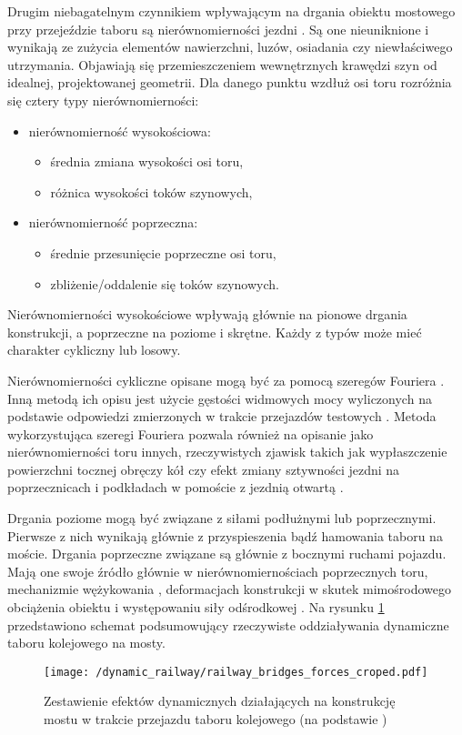 Drugim niebagatelnym czynnikiem wpływającym na drgania obiektu mostowego przy przejeździe taboru są nierównomierności jezdni \parencite{Ladislav1996,Dias2008}. Są one nieuniknione i wynikają ze zużycia elementów nawierzchni, luzów, osiadania czy niewłaściwego utrzymania. Objawiają się przemieszczeniem wewnętrznych krawędzi szyn od idealnej, projektowanej geometrii. Dla danego punktu wzdłuż osi toru rozróżnia się cztery typy nierównomierności:
\begin{itemize}[noitemsep]
	\item nierównomierność wysokościowa:
	\begin{itemize}
		\item średnia zmiana wysokości osi toru,
		\item różnica wysokości toków szynowych,
	\end{itemize}
	\item nierównomierność poprzeczna:
	\begin{itemize}
		\item średnie przesunięcie poprzeczne osi toru,
		\item zbliżenie/oddalenie się toków szynowych.
	\end{itemize}
\end{itemize}
Nierównomierności wysokościowe wpływają głównie na pionowe drgania konstrukcji, a poprzeczne na poziome i skrętne. Każdy z typów może mieć charakter cykliczny lub losowy. 

Nierównomierności cykliczne opisane mogą być za pomocą szeregów Fouriera \parencite{Ladislav1996}. Inną metodą ich opisu jest użycie gęstości widmowych mocy wyliczonych na podstawie odpowiedzi zmierzonych w trakcie przejazdów testowych \parencite{Claus1998,Dias2008}. Metoda wykorzystująca szeregi Fouriera pozwala również na opisanie jako nierównomierności toru innych, rzeczywistych zjawisk takich jak wypłaszczenie powierzchni tocznej obręczy kół \parencite{Zhou2020} czy efekt zmiany sztywności jezdni na poprzecznicach i podkładach w pomoście z jezdnią otwartą \parencite{Fryba1999}. 

Drgania poziome mogą być związane z siłami podłużnymi lub poprzecznymi. Pierwsze z nich wynikają głównie z przyspieszenia bądź hamowania taboru na moście. Drgania poprzeczne związane są głównie z bocznymi ruchami pojazdu. Mają one swoje źródło głównie w nierównomiernościach poprzecznych toru, mechanizmie wężykowania \parencite{Babe2016}, deformacjach konstrukcji w skutek mimośrodowego obciążenia obiektu i występowaniu siły odśrodkowej \parencite{Dias2008}. Na rysunku \ref{fig:railway_dynamic_forces} przedstawiono schemat podsumowujący rzeczywiste oddziaływania dynamiczne taboru kolejowego na mosty.
\begin{figure}[hbt!]
	\centering
	\texttt{[image: /dynamic\_railway/railway\_bridges\_forces\_croped.pdf]} 
	\captionsetup{justification=centering}
	\caption{Zestawienie efektów dynamicznych działających na konstrukcję mostu w trakcie przejazdu taboru kolejowego (na podstawie \parencite{Ladislav1996})}
	\label{fig:railway_dynamic_forces}
\end{figure}


